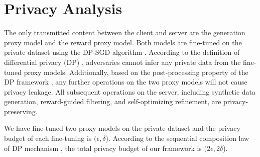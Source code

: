 \section{Privacy Analysis}
\label{sec:privacy_analysis}
The only transmitted content between the client and server are the generation proxy model and the reward proxy model. 
Both models are fine-tuned on the private dataset using the DP-SGD algorithm \cite{Abadi2016DeepLDP}. 
According to the definition of differential privacy (DP) \citep{DBLP:journals/fttcs/DworkR14}, adversaries cannot infer any private data from the fine-tuned proxy models. 
Additionally, based on the post-processing property of the DP framework \citep{DBLP:journals/fttcs/DworkR14}, any further operations on the two proxy models will not cause privacy leakage. 
All subsequent operations on the server, including synthetic data generation, reward-guided filtering, and self-optimizing refinement, are privacy-preserving.

We have fine-tuned two proxy models on the private dataset and the privacy budget of each fine-tuning is $(\epsilon, \delta$).
According to the sequential composition law of DP mechanism \citep{DBLP:journals/fttcs/DworkR14}, the total privacy budget of our framework is $(2\epsilon, 2\delta$).